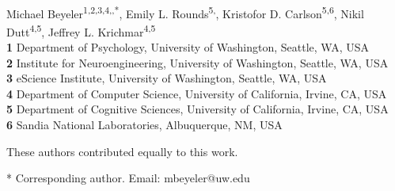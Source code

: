 \documentclass[10pt,letterpaper]{article}
\date{}
\begin{document}
\vspace*{0.2in}

\begin{flushleft}
{\Large
\textbf{} %
}
\newline
\\
Michael Beyeler\textsuperscript{1,2,3,4,\Yinyang,*},
Emily L. Rounds\textsuperscript{5,\Yinyang},
Kristofor D. Carlson\textsuperscript{5,6},
Nikil Dutt\textsuperscript{4,5},
Jeffrey L. Krichmar\textsuperscript{4,5}
\\
\bigskip
\textbf{1} Department of Psychology, University of Washington, Seattle, WA, USA \\
\textbf{2} Institute for Neuroengineering, University of Washington, Seattle, WA, USA \\
\textbf{3} eScience Institute, University of Washington, Seattle, WA, USA \\
\textbf{4} Department of Computer Science, University of California, Irvine, CA, USA \\
\textbf{5} Department of Cognitive Sciences, University of California, Irvine, CA, USA \\
\textbf{6} Sandia National Laboratories, Albuquerque, NM, USA \\
\bigskip

% 
%
\Yinyang These authors contributed equally to this work.





* Corresponding author. Email: mbeyeler@uw.edu

\end{flushleft}
\end{document}
